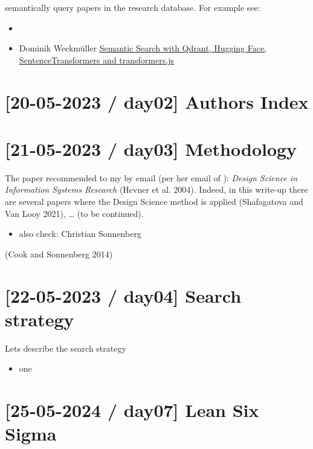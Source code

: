 \documentclass[
  letterpaper,
  DIV=11,
  numbers=noendperiod]{scrreprt}
\providecommand{\tightlist}{%
  \setlength{\itemsep}{0pt}\setlength{\parskip}{0pt}}\usepackage{longtable,booktabs,array}
\begin{document}
semantically query papers in the research database. For example see:

\begin{itemize}
\tightlist
\item
  \href{}{}
\item
  Dominik Weckmüller
  \href{https://geo.rocks/post/qdrant-transformers-js-semantic-search/}{Semantic
  Search with Qdrant, Hugging Face, SentenceTransformers and
  transformers.js}
\end{itemize}

\hypertarget{day02-authors-index}{%
\section{{[}20-05-2023 / day02{]} Authors
Index}\label{day02-authors-index}}

\hypertarget{day03-methodology}{%
\section{{[}21-05-2023 / day03{]} Methodology}\label{day03-methodology}}

The paper recommended to my by email (per her email of ): \emph{Design
Science in Information Systems Research} (Hevner et al. 2004). Indeed,
in this write-up there are several papers where the Design Science
method is applied (Shafagatova and Van Looy 2021), \ldots{} (to be
continued).

\begin{itemize}
\tightlist
\item
  also check: Christian Sonnenberg
\end{itemize}

(Cook and Sonnenberg 2014)

\hypertarget{day04-search-strategy}{%
\section{{[}22-05-2023 / day04{]} Search
strategy}\label{day04-search-strategy}}

Lets describe the search strategy

\begin{itemize}
\tightlist
\item
  one
\end{itemize}

\hypertarget{day07-lean-six-sigma}{%
\section{{[}25-05-2024 / day07{]} Lean Six
Sigma}\label{day07-lean-six-sigma}}
\end{document}
